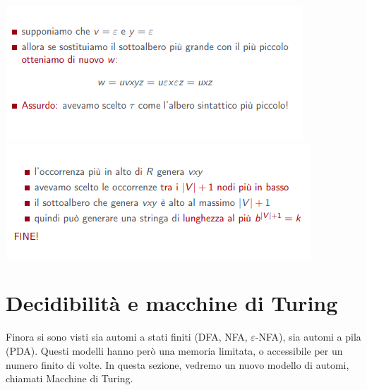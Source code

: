 \documentclass[]{article}
\begin{document}
\begin{center}
				\includegraphics{PLCFG8.png}
				\includegraphics{PLCFG9.png}
			\end{center}
	\section{Decidibilità e macchine di Turing}
		Finora si sono visti sia automi a stati finiti (DFA, NFA, $\varepsilon$-NFA), sia automi a pila (PDA). Questi modelli hanno però una memoria limitata, o accessibile per un numero finito di volte. In questa sezione, vedremo un nuovo modello di automi, chiamati Macchine di Turing.
\end{document}
